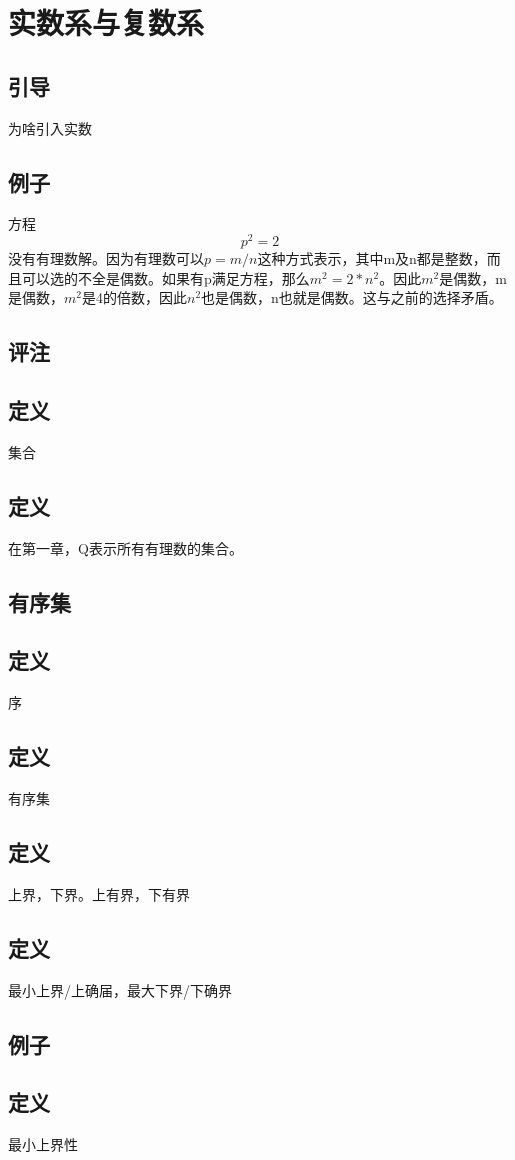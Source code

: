 \chapter{实数系与复数系}
\section*{引导}为啥引入实数
\section{例子}方程 \[ p^2 = 2 \] 没有有理数解。因为有理数可以\( p=m/n \)这种方式表示，其中m及n都是整数，而且可以选的不全是偶数。如果有p满足方程，那么\(m^2 = 2 * n^2\)。因此\(m^2\)是偶数，m是偶数，\(m^2\)是4的倍数，因此\(n^2\)也是偶数，n也就是偶数。这与之前的选择矛盾。
\section{评注}
\section{定义} 集合
\section{定义} 在第一章，Q表示所有有理数的集合。
\section*{有序集}
\section{定义} 序
\section{定义} 有序集
\section{定义} 上界，下界。上有界，下有界
\section{定义} 最小上界/上确届，最大下界/下确界
\section{例子} 
\section{定义} 最小上界性
